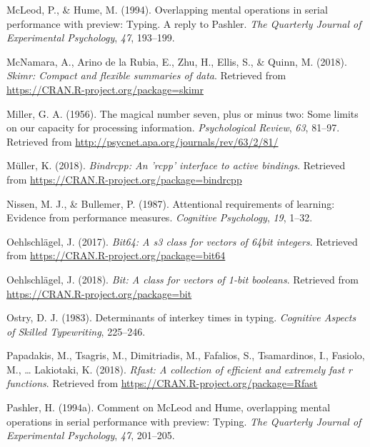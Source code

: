 \documentclass[,man,donotrepeattitle,floatsintext]{apa6}
\begin{document}
\leavevmode\hypertarget{ref-mcleod_overlapping_1994}{}%
McLeod, P., \& Hume, M. (1994). Overlapping mental operations in serial performance with preview: Typing. A reply to Pashler. \emph{The Quarterly Journal of Experimental Psychology}, \emph{47}, 193--199.

\leavevmode\hypertarget{ref-R-skimr}{}%
McNamara, A., Arino de la Rubia, E., Zhu, H., Ellis, S., \& Quinn, M. (2018). \emph{Skimr: Compact and flexible summaries of data}. Retrieved from \url{https://CRAN.R-project.org/package=skimr}

\leavevmode\hypertarget{ref-miller_magical_1956}{}%
Miller, G. A. (1956). The magical number seven, plus or minus two: Some limits on our capacity for processing information. \emph{Psychological Review}, \emph{63}, 81--97. Retrieved from \url{http://psycnet.apa.org/journals/rev/63/2/81/}

\leavevmode\hypertarget{ref-R-bindrcpp}{}%
Müller, K. (2018). \emph{Bindrcpp: An 'rcpp' interface to active bindings}. Retrieved from \url{https://CRAN.R-project.org/package=bindrcpp}

\leavevmode\hypertarget{ref-NissenAttentionalrequirementslearning1987}{}%
Nissen, M. J., \& Bullemer, P. (1987). Attentional requirements of learning: Evidence from performance measures. \emph{Cognitive Psychology}, \emph{19}, 1--32.

\leavevmode\hypertarget{ref-R-bit64}{}%
Oehlschlägel, J. (2017). \emph{Bit64: A s3 class for vectors of 64bit integers}. Retrieved from \url{https://CRAN.R-project.org/package=bit64}

\leavevmode\hypertarget{ref-R-bit}{}%
Oehlschlägel, J. (2018). \emph{Bit: A class for vectors of 1-bit booleans}. Retrieved from \url{https://CRAN.R-project.org/package=bit}

\leavevmode\hypertarget{ref-OstryDeterminantsinterkeytimes1983}{}%
Ostry, D. J. (1983). Determinants of interkey times in typing. \emph{Cognitive Aspects of Skilled Typewriting}, 225--246.

\leavevmode\hypertarget{ref-R-Rfast}{}%
Papadakis, M., Tsagris, M., Dimitriadis, M., Fafalios, S., Tsamardinos, I., Fasiolo, M., \ldots{} Lakiotaki, K. (2018). \emph{Rfast: A collection of efficient and extremely fast r functions}. Retrieved from \url{https://CRAN.R-project.org/package=Rfast}

\leavevmode\hypertarget{ref-pashler_comment_1994}{}%
Pashler, H. (1994a). Comment on McLeod and Hume, overlapping mental operations in serial performance with preview: Typing. \emph{The Quarterly Journal of Experimental Psychology}, \emph{47}, 201--205.
\end{document}
